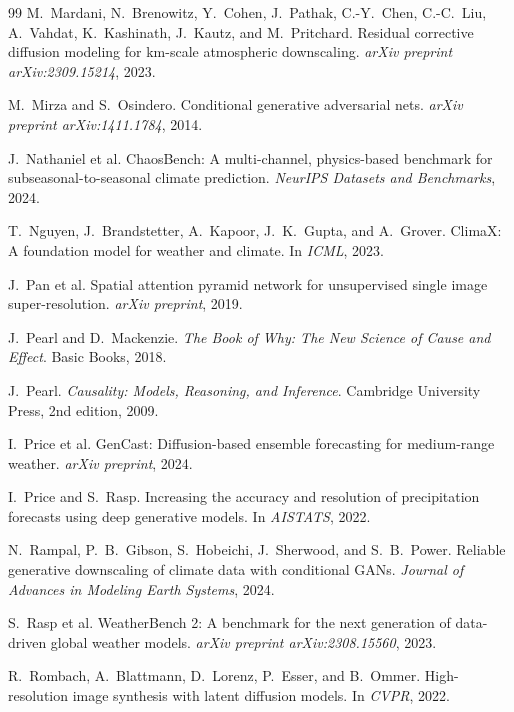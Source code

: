 \documentclass[14pt,a4paper,openany]{extreport}
\theoremstyle{definition}
\begin{document}
\begin{thebibliography}{99}
 M.~Mardani, N.~Brenowitz, Y.~Cohen, J.~Pathak, C.-Y.~Chen, C.-C.~Liu, A.~Vahdat, K.~Kashinath, J.~Kautz, and M.~Pritchard. Residual corrective diffusion modeling for km-scale atmospheric downscaling. \emph{arXiv preprint arXiv:2309.15214}, 2023.

 M.~Mirza and S.~Osindero. Conditional generative adversarial nets. \emph{arXiv preprint arXiv:1411.1784}, 2014.

 J.~Nathaniel et al. ChaosBench: A multi-channel, physics-based benchmark for subseasonal-to-seasonal climate prediction. \emph{NeurIPS Datasets and Benchmarks}, 2024.

 T.~Nguyen, J.~Brandstetter, A.~Kapoor, J.~K.~Gupta, and A.~Grover. ClimaX: A foundation model for weather and climate. In \emph{ICML}, 2023.

 J.~Pan et al. Spatial attention pyramid network for unsupervised single image super-resolution. \emph{arXiv preprint}, 2019.

 J.~Pearl and D.~Mackenzie. \emph{The Book of Why: The New Science of Cause and Effect}. Basic Books, 2018.

 J.~Pearl. \emph{Causality: Models, Reasoning, and Inference}. Cambridge University Press, 2nd edition, 2009.

 I.~Price et al. GenCast: Diffusion-based ensemble forecasting for medium-range weather. \emph{arXiv preprint}, 2024.

 I.~Price and S.~Rasp. Increasing the accuracy and resolution of precipitation forecasts using deep generative models. In \emph{AISTATS}, 2022.

 N.~Rampal, P.~B.~Gibson, S.~Hobeichi, J.~Sherwood, and S.~B.~Power. Reliable generative downscaling of climate data with conditional GANs. \emph{Journal of Advances in Modeling Earth Systems}, 2024.

 S.~Rasp et al. WeatherBench 2: A benchmark for the next generation of data-driven global weather models. \emph{arXiv preprint arXiv:2308.15560}, 2023.

 R.~Rombach, A.~Blattmann, D.~Lorenz, P.~Esser, and B.~Ommer. High-resolution image synthesis with latent diffusion models. In \emph{CVPR}, 2022.


\end{thebibliography}
\end{document}
